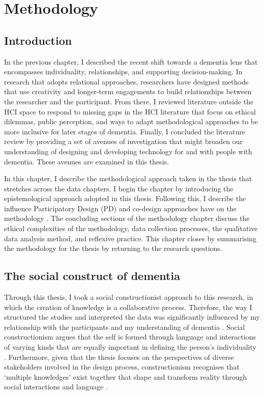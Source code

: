 \chapter{Methodology}
\label{Methodology}

\section{Introduction}
\label{Method:Intro}
In the previous chapter, I described the recent shift towards a dementia lens that encompasses individuality, relationships, and supporting decision-making. In research that adopts relational approaches, researchers have designed methods that use creativity and longer-term engagements to build relationships between the researcher and the participant. From there, I reviewed literature outside the HCI space to respond to missing gaps in the HCI literature that focus on ethical dilemmas, public perception, and ways to adapt methodological approaches to be more inclusive for later stages of dementia. Finally, I concluded the literature review by providing a set of avenues of investigation that might broaden our understanding of designing and developing technology for and with people with dementia. These avenues are examined in this thesis.

In this chapter, I describe the methodological approach taken in the thesis that stretches across the data chapters. I begin the chapter by introducing the epistemological approach adopted in this thesis. Following this, I describe the influence Participatory Design (PD) and co-design approaches have on the methodology \citep{duarte2018participatory}. The concluding sections of the methodology chapter discuss the ethical complexities of the methodology, data collection processes, the qualitative data analysis method, and reflexive practice. This chapter closes by summarising the methodology for the thesis by returning to the research questions.  

\section{The social construct of dementia}
\label{social construct}
Through this thesis, I took a social constructionist approach to this research, in which the creation of knowledge is a collaborative process. Therefore, the way I structured the studies and interpreted the data was significantly influenced by my relationship with the participants and my understanding of dementia \citep{surr2006preservation}. Social constructionism argues that the self is formed through language and interactions of varying kinds that are equally important in defining the person's individuality \citep{sarup1996identity}. Furthermore, given that the thesis focuses on the perspectives of diverse stakeholders involved in the design process, constructionism recognises that `multiple knowledges' exist together that shape and transform reality through social interactions and language \citep{mckeown2015you}.

